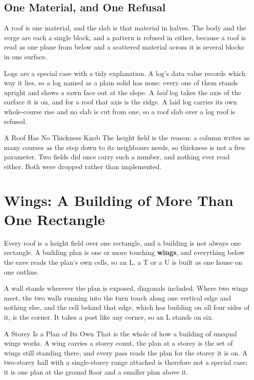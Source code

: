 \subsection{One Material, and One Refusal}

A roof is one material, and the slab is that material in halves. The body and the
verge are each a single block, and a pattern is refused in either, because a roof
is read as one plane from below and a scattered material across it is several
blocks in one surface.

Logs are a special case with a tidy explanation. A log's data value records which
way it lies, so a log named as a plain solid has none: every one of them stands
upright and shows a sawn face out at the slope. A \emph{laid} log takes the axis of
the surface it is on, and for a roof that axis is the ridge. A laid log carries its
own whole-course rise and no slab is cut from one, so a roof slab over a log roof
is refused.

\begin{ruling}{A Roof Has No Thickness Knob}
The height field is the reason: a column writes as many courses as the step down to
its neighbours needs, so thickness is not a free parameter. Two fields did once
carry such a number, and nothing ever read either. Both were dropped rather than
implemented.
\end{ruling}

\section{Wings: A Building of More Than One Rectangle}

Every roof is a height field over one rectangle, and a building is not always one
rectangle. A building plan is one or more touching \textbf{wings}, and everything
below the eave reads the plan's own cells, so an L, a T or a U is built as one
house on one outline.

A wall stands wherever the plan is exposed, diagonals included. Where two wings
meet, the two walls running into the turn touch along one vertical edge and nothing
else, and the cell behind that edge, which has building on all four sides of it, is
the corner. It takes a post like any corner, so an L stands on six.

\begin{ruling}{A Storey Is a Plan of Its Own}
That is the whole of how a building of unequal wings works. A wing carries a storey
count, the plan at a storey is the set of wings still standing there, and every
pass reads the plan for the storey it is on. A two-storey hall with a single-storey
range attached is therefore not a special case; it is one plan at the ground floor
and a smaller plan above it.
\end{ruling}
